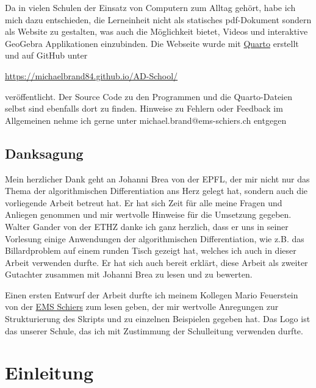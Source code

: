 \documentclass[
  a4paper,
  DIV=11]{scrreprt}
\theoremstyle{definition}
\theoremstyle{definition}
\theoremstyle{remark}
\begin{document}
Da in vielen Schulen der Einsatz von Computern zum Alltag gehört, habe
ich mich dazu entschieden, die Lerneinheit nicht als statisches
pdf-Dokument sondern als Website zu gestalten, was auch die Möglichkeit
bietet, Videos und interaktive GeoGebra Applikationen einzubinden. Die
Webseite wurde mit \href{https://quarto.org/}{Quarto} erstellt und auf
GitHub unter

\url{https://michaelbrand84.github.io/AD-School/}

veröffentlicht. Der Source Code zu den Programmen und die Quarto-Dateien
selbst sind ebenfalls dort zu finden. Hinweise zu Fehlern oder Feedback
im Allgemeinen nehme ich gerne unter michael.brand@ems-schiers.ch
entgegen

\hypertarget{danksagung}{%
\section*{Danksagung}\label{danksagung}}


Mein herzlicher Dank geht an Johanni Brea von der EPFL, der mir nicht
nur das Thema der algorithmischen Differentiation ans Herz gelegt hat,
sondern auch die vorliegende Arbeit betreut hat. Er hat sich Zeit für
alle meine Fragen und Anliegen genommen und mir wertvolle Hinweise für
die Umsetzung gegeben. Walter Gander von der ETHZ danke ich ganz
herzlich, dass er uns in seiner Vorlesung einige Anwendungen der
algorithmischen Differentiation, wie z.B. das Billardproblem auf einem
runden Tisch gezeigt hat, welches ich auch in dieser Arbeit verwenden
durfte. Er hat sich auch bereit erklärt, diese Arbeit als zweiter
Gutachter zusammen mit Johanni Brea zu lesen und zu bewerten.

Einen ersten Entwurf der Arbeit durfte ich meinem Kollegen Mario
Feuerstein von der \href{https://ems-schiers.ch/}{EMS Schiers} zum lesen
geben, der mir wertvolle Anregungen zur Strukturierung des Skripts und
zu einzelnen Beispielen gegeben hat. Das Logo ist das unserer Schule,
das ich mit Zustimmung der Schulleitung verwenden durfte.


\hypertarget{einleitung}{%
\chapter*{Einleitung}\label{einleitung}}
\end{document}
